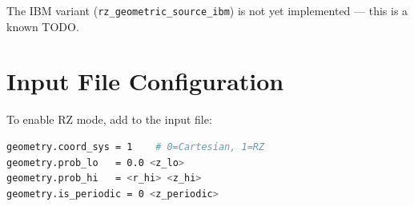 \documentclass[11pt,a4paper]{article}
\begin{document}
The IBM variant (\texttt{rz\_geometric\_source\_ibm}) is not yet
implemented --- this is a known TODO.

\section{Input File Configuration}

To enable RZ mode, add to the input file:
\begin{lstlisting}[language=bash,frame=single]
geometry.coord_sys = 1    # 0=Cartesian, 1=RZ
geometry.prob_lo   = 0.0 <z_lo>
geometry.prob_hi   = <r_hi> <z_hi>
geometry.is_periodic = 0 <z_periodic>
\end{lstlisting}
\end{document}
